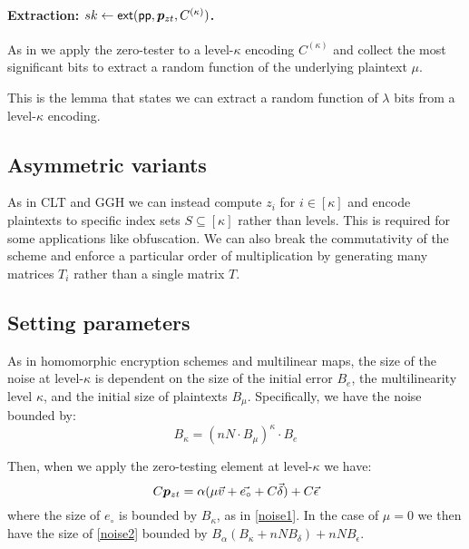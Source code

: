 \paragraph{Extraction: $sk \leftarrow \mathsf{ext}(\mathsf{pp}, \bm{p}_{zt}, C^{(\kappa)})$.}  As in \cite{ggh13a, clt15} we apply the zero-tester to a level-$\kappa$ encoding $C^{(\kappa)}$ and collect the most significant bits to extract a random function of the underlying plaintext $\mu$.

\begin{lemma}
\label{extraction}
This is the lemma that states we can extract a random function of $\lambda$ bits from a level-$\kappa$ encoding.
\end{lemma}





\subsection{Asymmetric variants}

As in CLT and GGH we can instead compute $z_i$ for $i \in [\kappa]$ and encode plaintexts to specific index sets $S \subseteq [\kappa]$ rather than levels.  This is required for some applications like obfuscation.  We can also break the commutativity of the scheme and enforce a particular order of multiplication by generating many matrices $T_i$ rather than a single matrix $T$.

\subsection{Setting parameters}

As in homomorphic encryption schemes and multilinear maps, the size of the noise at level-$\kappa$ is dependent on the size of the initial error $B_e$, the multilinearity level $\kappa$, and the initial size of plaintexts $B_\mu$.  Specifically, we have the noise bounded by:
\begin{equation}
\label{noise1}
B_\kappa = (nN\cdot B_\mu)^\kappa \cdot B_e
\end{equation}

Then, when we apply the zero-testing element at level-$\kappa$ we have:
\begin{equation}
\label{noise2}
C\bm{p}_{zt} = \alpha (\mu \vec{v} + \vec{e_{\circ}} + C\vec{\delta}) + C\vec{\epsilon}
\end{equation}
where the size of $e_{\circ}$ is bounded by $B_\kappa$, as in \eqref{noise1}.  In the case of $\mu = 0$ we then have the size of \eqref{noise2} bounded by $B_\alpha(B_\kappa + nNB_\delta) + nNB_\epsilon$.

